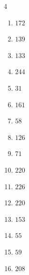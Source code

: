 \begin{multicols}{4}
\begin{enumerate}
  \item $172$


  \item $139$


  \item $133$


  \item $244$


  \item $31$


  \item $161$


  \item $58$


  \item $126$


  \item $71$


  \item $220$


  \item $226$


\columnbreak %

  \item $220$


  \item $153$


  \item $55$


  \item $59$


  \item $208$


\end{enumerate}
\end{multicols}
